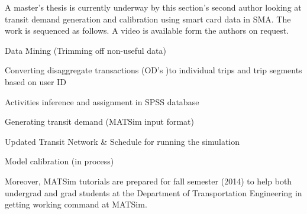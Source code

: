 A master's thesis is currently underway by this section's second author looking at transit demand generation and calibration using smart card data in SMA. The work is sequenced as follows. A video is available form the authors on request.
%
\begin{compactitem}
\item Data Mining (Trimming off non-useful data)
\item	Converting disaggregate transactions (OD’s )to individual trips and trip segments based on user ID
\item	Activities inference and assignment in SPSS database
\item	Generating transit demand (MATSim input format)
\item	Updated Transit Network \& Schedule for running the simulation
\item	Model calibration (in process)
\end{compactitem}
%
Moreover, MATSim tutorials are prepared for fall semester (2014) to help both undergrad and grad students at the Department of Transportation Engineering in getting working command at MATSim.

 
 